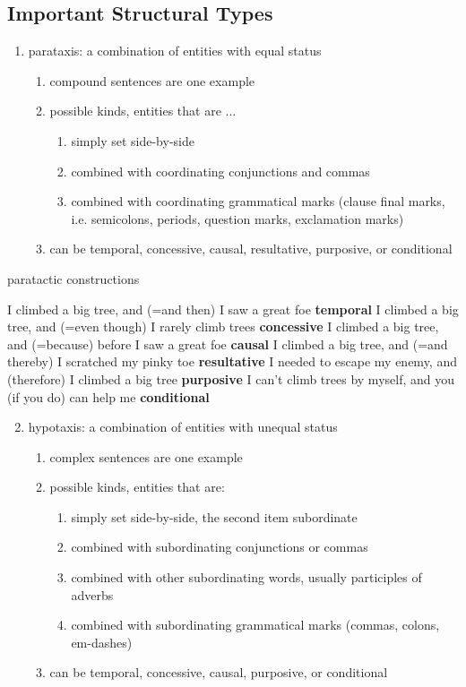 \documentclass[12pt]{article}
\begin{document}
\subsection{Important Structural Types}
\begin{enumerate}
\item parataxis: a combination of entities with equal status
    \begin{enumerate}
    \item compound sentences are one example
    \item possible kinds, entities that are ...
        \begin{enumerate}
        \item simply set side-by-side
        \item combined with coordinating conjunctions and commas
        \item combined with coordinating grammatical marks (clause final marks, i.e. semicolons, periods, question marks, exclamation marks)
        \end{enumerate}
    \item can be temporal, concessive, causal, resultative, purposive, or conditional
    \end{enumerate}
\end{enumerate}
\begin{exe}
\ex paratactic constructions
    \begin{xlist}
    \ex I climbed a big tree, and (=and then) I saw a great foe \hfill \textbf{temporal}
    \ex I climbed a big tree, and (=even though) I rarely climb trees \hfill \textbf{concessive}
    \ex I climbed a big tree, and (=because) before I saw a great foe \hfill \textbf{causal}
    \ex I climbed a big tree, and (=and thereby) I scratched my pinky toe \hfill \textbf{resultative}
    \ex I needed to escape my enemy, and (therefore) I climbed a big tree \hfill \textbf{purposive}
    \ex I can't climb trees by myself, and you (if you do) can help me \hfill \textbf{conditional}
    \end{xlist}
\end{exe}
\begin{enumerate}
\setcounter{enumi}{1}
\item hypotaxis: a combination of entities with unequal status
    \begin{enumerate}
    \item complex sentences are one example
    \item possible kinds, entities that are:
        \begin{enumerate}
        \item simply set side-by-side, the second item subordinate
        \item combined with subordinating conjunctions or commas
        \item combined with other subordinating words, usually participles of adverbs
        \item combined with subordinating grammatical marks (commas, colons, em-dashes)
        \end{enumerate}
    \item can be temporal, concessive, causal, purposive, or conditional
    \end{enumerate}
\end{enumerate}
\end{document}
